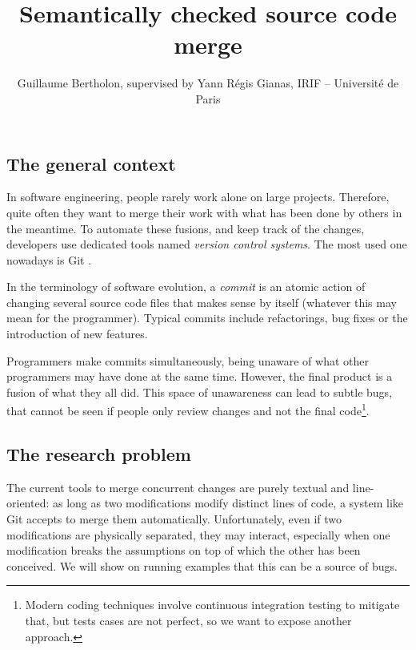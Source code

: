 \documentclass[a4paper,11pt]{article}
\title{Semantically checked source code merge}
\author{Guillaume Bertholon, supervised by Yann Régis Gianas, IRIF -- Université de Paris}
\newcommand\todo[1]{}%
\begin{document}
\maketitle


\subsection*{The general context}


In software engineering, people rarely work alone on large
projects. Therefore, quite often they want to merge their work with
what has been done by others in the meantime.
%
To automate these fusions, and keep track of the changes, developers
use dedicated tools named \textit{version control systems}. The most
used one nowadays is Git \cite{git}.

In the terminology of software evolution, a \textit{commit} is an
atomic action of changing several source code files that makes sense
by itself (whatever this may mean for the programmer). Typical commits
include refactorings, bug fixes or the introduction of new features.

Programmers make commits simultaneously, being unaware of what other
programmers may have done at the same time. However, the final product
is a fusion of what they all did. This space of unawareness can lead
to subtle bugs, that cannot be seen if people only review changes and
not the final code\footnote{Modern coding techniques involve
  continuous integration testing \cite{fowler2006continuous} to
  mitigate that, but tests cases are not perfect, so we want to expose
  another approach.}.

\subsection*{The research problem}


The current tools to merge concurrent changes are purely textual and
line-oriented: as long as two modifications modify distinct lines of
code, a system like Git accepts to merge them
automatically. Unfortunately, even if two modifications are physically
separated, they may interact, especially when one modification breaks
the assumptions on top of which the other has been conceived.  We will
show on running examples that this can be a source of bugs.
\end{document}
